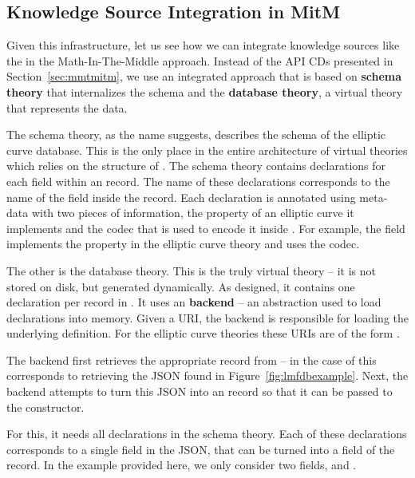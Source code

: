 \subsection{Knowledge Source Integration in MitM}

Given this infrastructure, let us see how we can integrate knowledge sources like the
\lmfdb in the Math-In-The-Middle approach. Instead of the API CDs presented in
Section~\ref{sec:mmtmitm}, we use an integrated approach that is based on \textbf{schema
  theory} that internalizes the \lmfdb schema and the \textbf{database theory}, a virtual
theory that represents the \lmfdb data.

The schema theory, as the name suggests, describes the schema of the \lmfdb elliptic curve
database.  This is the only place in the entire architecture of virtual theories which
relies on the structure of \lmfdb.  The schema theory contains declarations for each field
within an \lmfdb record.  The name of these declarations corresponds to the name of the
field inside the record.  Each declaration is annotated using \mmt meta-data with two
pieces of information, the property of an elliptic curve it implements and the codec that
is used to encode it inside \lmfdb.  For example, the  field implements
the  property in the elliptic curve theory and uses the
 codec.

The other is the database theory. This is the truly virtual theory -- it is not stored on
disk, but generated dynamically.  As designed, it contains one declaration per record in
\lmfdb. It uses an \mmt \textbf{backend} -- an \mmt abstraction used to load declarations
into memory.  Given a URI, the backend is responsible for loading the underlying
definition.  For the elliptic curve theories these URIs are of the form
. 

The backend first retrieves the appropriate record from {\lmfdb} -- in the case of
 this corresponds to retrieving the JSON found in
Figure~\ref{fig:lmfdbexample}.  Next, the backend attempts to turn this JSON into an \mmt
record so that it can be passed to the  constructor.

For this, it needs all declarations in the schema theory.  Each of these declarations
corresponds to a single field in the JSON, that can be turned into a field of the \mmt
record.  In the example provided here, we only consider two fields, 
and .

